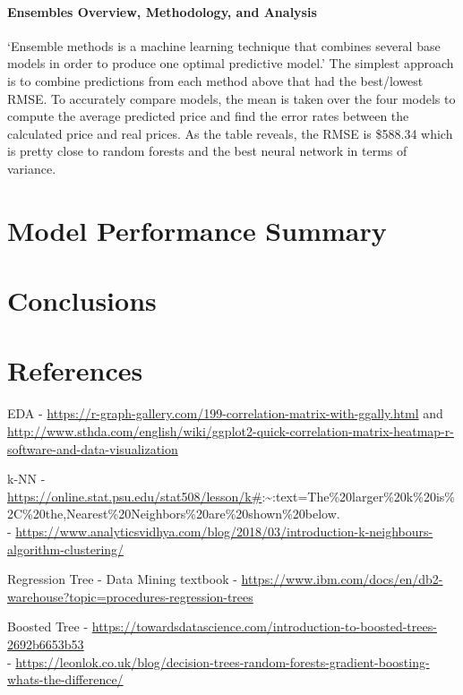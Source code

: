 \documentclass[
  paper=a4,
  ,captions=tableheading
]{scrartcl}
\begin{document}
\hypertarget{ensembles-overview-methodology-and-analysis}{%
\paragraph{Ensembles Overview, Methodology, and
Analysis}\label{ensembles-overview-methodology-and-analysis}}

`Ensemble methods is a machine learning technique that combines several
base models in order to produce one optimal predictive model.' The
simplest approach is to combine predictions from each method above that
had the best/lowest RMSE. To accurately compare models, the mean is
taken over the four models to compute the average predicted price and
find the error rates between the calculated price and real prices. As
the table reveals, the RMSE is \$588.34 which is pretty close to random
forests and the best neural network in terms of variance.

\hypertarget{model-performance-summary}{%
\section{Model Performance Summary}\label{model-performance-summary}}

\hypertarget{conclusions}{%
\section{Conclusions}\label{conclusions}}

\hypertarget{references}{%
\section{References}\label{references}}

EDA -
\url{https://r-graph-gallery.com/199-correlation-matrix-with-ggally.html}
and
\url{http://www.sthda.com/english/wiki/ggplot2-quick-correlation-matrix-heatmap-r-software-and-data-visualization}

k-NN -
\url{https://online.stat.psu.edu/stat508/lesson/k\#}:\textasciitilde:text=The\%20larger\%20k\%20is\%2C\%20the,Nearest\%20Neighbors\%20are\%20shown\%20below.\\
-
\url{https://www.analyticsvidhya.com/blog/2018/03/introduction-k-neighbours-algorithm-clustering/}

Regression Tree - Data Mining textbook -
\url{https://www.ibm.com/docs/en/db2-warehouse?topic=procedures-regression-trees}

Boosted Tree -
\url{https://towardsdatascience.com/introduction-to-boosted-trees-2692b6653b53}\\
-
\url{https://leonlok.co.uk/blog/decision-trees-random-forests-gradient-boosting-whats-the-difference/}
\end{document}
